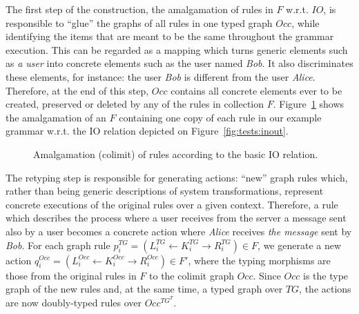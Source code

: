 The first step of the construction, the amalgamation of rules in $F$ w.r.t. $IO$, is responsible to ``glue'' the graphs of all rules in one typed graph $Occ$, while identifying the items that are meant to be the same throughout the grammar execution. This can be regarded as a mapping which turns generic elements such as \textit{a user} into concrete elements such as the user named \textit{Bob}. It also discriminates these elements, for instance: the user \textit{Bob} is different from the user
\textit{Alice}. Therefore, at the end of this step, $Occ$ contains all concrete elements ever to be created, preserved or deleted by any of the rules in collection $F$. Figure~\ref{fig:tests:amalgamation} shows the amalgamation of an $F$ containing one copy of each rule in our example grammar w.r.t. the IO relation depicted on Figure~\ref{fig:tests:inout}.

\begin{figure}[!ht]
  \centering
  \caption{Amalgamation (colimit) of rules according to the basic IO relation.}\label{fig:tests:amalgamation}
\end{figure}

The retyping step is responsible for generating actions: ``new'' graph rules which, rather than being generic descriptions of system transformations, represent concrete executions of the original rules over a given context. Therefore, a rule which describes the process where a user receives from the server a message sent also by a user becomes a concrete action where \textit{Alice} receives \textit{the message} sent by \textit{Bob}.
For each graph rule $\mbox{$p_i^{TG} = \left(L_i^{TG} \leftarrow K_i^{TG} \rightarrow R_i^{TG}\right)$} \in F$, we generate a new action \mbox{$q_i^{Occ} = \left(L_i^{Occ} \leftarrow K_i^{Occ} \rightarrow R_i^{Occ}\right) \in F'$}, where the typing morphisms are those from the original rules in $F$ to the colimit graph $Occ$. Since $Occ$ is the type graph of the new rules and, at the same time, a typed graph over $TG$, the actions are now doubly-typed rules over $Occ^{TG^T}$.


